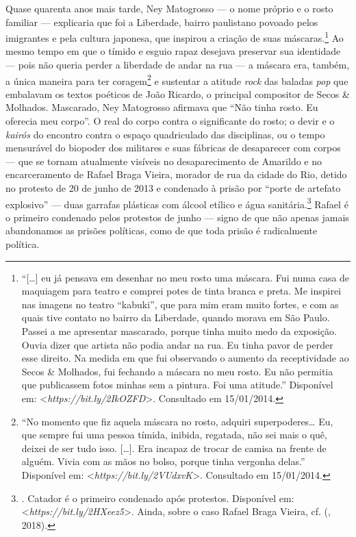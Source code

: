 Quase quarenta anos mais tarde, Ney Matogrosso --- o nome próprio e o
rosto familiar --- explicaria que foi a Liberdade, bairro paulistano
povoado pelos imigrantes e pela cultura japonesa, que inspirou a criação
de suas máscaras.\footnote{``{[}\ldots{}{]} eu já pensava em
  desenhar no meu rosto uma máscara. Fui numa casa de maquiagem para
  teatro e comprei potes de tinta branca e preta. Me inspirei nas
  imagens no teatro ``kabuki'', que para mim eram muito fortes, e com as
  quais tive contato no bairro da Liberdade, quando morava em São Paulo.
  Passei a me apresentar mascarado, porque tinha muito medo da
  exposição. Ouvia dizer que artista não podia andar na rua. Eu tinha
  pavor de perder esse direito. Na medida em que fui observando o
  aumento da receptividade ao Secos \& Molhados, fui fechando a máscara
  no meu rosto. Eu não permitia que publicassem fotos minhas sem a
  pintura. Foi uma atitude.'' Disponível em:
  \textless{}\emph{https://bit.ly/2IkOZFD}\textgreater{}. Consultado em
  15/01/2014.}
Ao mesmo tempo em que o tímido e esguio rapaz desejava preservar sua
identidade --- pois não queria perder a liberdade de andar na rua --- a
máscara era, também, a única maneira para ter
coragem\footnote{``No momento que fiz aquela máscara no
  rosto, adquiri superpoderes\ldots{} Eu, que sempre fui uma pessoa
  tímida, inibida, regatada, não sei mais o quê, deixei de ser tudo
  isso. {[}\ldots{}{]}. Era incapaz de trocar de camisa na frente de
  alguém. Vivia com as mãos no bolso, porque tinha vergonha delas.''
  Disponível em:
  \textless{}\emph{https://bit.ly/2VUdxvK}\textgreater{}. Consultado em
  15/01/2014.}
e sustentar a atitude \emph{rock} das baladas \emph{pop }que embalavam
os textos poéticos de João Ricardo, o principal compositor de Secos \&
Molhados. Mascarado, Ney Matogrosso afirmava que ``Não tinha rosto. Eu
oferecia meu corpo''. O real do corpo contra o significante do rosto; o
devir e o \emph{kairós} do encontro contra o espaço quadriculado das
disciplinas, ou o tempo mensurável do biopoder dos militares e suas
fábricas de desaparecer com corpos --- que se tornam atualmente visíveis
no desaparecimento de Amarildo e no encarceramento de Rafael Braga
Vieira, morador de rua da cidade do Rio, detido no protesto de 20 de
junho de 2013 e condenado à prisão por ``porte de artefato explosivo''
--- duas garrafas plásticas com álcool etílico e água
sanitária.\footnote{. Catador é o
  primeiro condenado após protestos. Disponível em:
  \textless{}\emph{https://bit.ly/2HXeez5}\textgreater{}.
  Ainda, sobre o caso Rafael Braga Vieira, cf. (, 2018).} Rafael
é o primeiro condenado pelos protestos de junho --- signo de que não
apenas jamais abandonamos as prisões políticas, como de que toda prisão
é radicalmente política.


